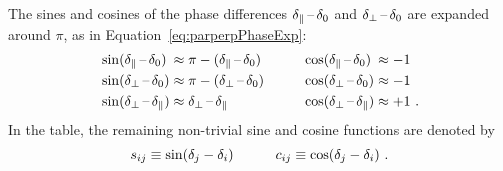 The sines and cosines of the phase differences $\delta_{\parallel}\,\text{--}\,\delta_{0}$ and $\delta_{\perp}\,\text{--}\,\delta_{0}$ are expanded around $\pi$, as in
Equation~\ref{eq:parperpPhaseExp}:
\begin{equation}
  \begin{alignedat}{4}
    &\sin(\delta_{\parallel}\,\text{--}\,\delta_{0})  &&\approx \pi - (\delta_{\parallel}\,\text{--}\,\delta_{0}) \qquad\quad &&\cos(\delta_{\parallel}\,\text{--}\,\delta_{0})  &&\approx -1  \\
    &\sin(\delta_{\perp}\,\text{--}\,\delta_{0}) &&\approx \pi - (\delta_{\perp}\,\text{--}\,\delta_{0})            &&\cos(\delta_{\perp}\,\text{--}\,\delta_{0}) &&\approx -1  \\
    &\sin(\delta_{\perp}\,\text{--}\,\delta_{\parallel})  &&\approx \delta_{\perp}\,\text{--}\,\delta_{\parallel}                     &&\cos(\delta_{\perp}\,\text{--}\,\delta_{\parallel})  &&\approx +1  \ .
  \end{alignedat}
\end{equation}
In the table, the remaining non-trivial sine and cosine functions are denoted by
\begin{equation}
  s_{ij} \equiv \sin(\delta_j - \delta_i) \qquad\quad
  c_{ij} \equiv \cos(\delta_j - \delta_i) \ .
\end{equation}

